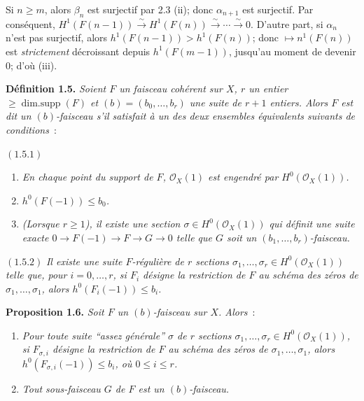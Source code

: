 Si \(n\ge m\),
alors \(\beta_n\) est surjectif par 2.3 (ii); donc \(\alpha_{n+1}\) est surjectif. Par conséquent, \(H^1(F(n-1))\xrightarrow{\sim}H^1(F(n))\xrightarrow{\sim}\cdots\xrightarrow{\sim}0\). D'autre part, si \(\alpha_n\) n'est pas surjectif, alors \(h^1(F(n-1))>h^1(F(n))\); donc \(\mapsto n^1(F(n))\) est \emph{strictement} décroissant depuis \(h^1(F(m-1))\), jusqu'au moment de devenir \(0\); d'où (iii).

\textbf{Définition 1.5.} \emph{Soient \(F\) un faisceau cohérent sur \(X\), \(r\) un entier \(\ge\operatorname{dim{.}supp}(F)\) et \((b)=(b_0,\ldots,b_r)\) une suite de \(r+1\) entiers. Alors \(F\) est dit un \emph{\((b)\)-faisceau} s'il satisfait à un des deux ensembles équivalents suivants de conditions}~:

\((1.5.1)\)
\begin{enumerate}[label=(\roman*)]
\item \emph{En chaque point du support de \(F\), \(\mathcal O_X(1)\) est engendré par \(H^0(\mathcal O_X(1))\).}
\item \emph{\(h^0(F(-1))\le b_0\).}
\item \emph{(Lorsque \(r\ge1\)), il existe une section \(\sigma\in H^0(\mathcal O_X(1))\) qui définit une suite exacte \(0\to F(-1)\to F\to G\to0\) telle que \(G\) soit un \((b_1,\ldots,b_r)\)-faisceau.}
\end{enumerate}

\((1.5.2)\) \emph{Il existe une suite \(F\)-régulière de \(r\) sections \(\sigma_1,\ldots,\sigma_r\in H^0(\mathcal O_X(1))\) telle que, pour \(i=0,\ldots,r\), si \(F_i\) désigne la restriction de \(F\) au schéma des zéros de \(\sigma_1,\ldots,\sigma_1\), alors \(h^0(F_i(-1))\le b_i\).}

\textbf{Proposition 1.6.} \emph{Soit \(F\) un \((b)\)-faisceau sur \(X\). Alors}~:
\begin{enumerate}[label=(\roman*)]
\item \emph{Pour toute suite ``assez générale'' \(\sigma\) de \(r\) sections \(\sigma_1,\ldots,\sigma_r\in H^0(\mathcal O_X(1))\), si \(F_{\sigma,i}\) désigne la restriction de \(F\) au schéma des zéros de \(\sigma_1,\ldots,\sigma_1\), alors \(h^0(F_{\sigma,i}(-1))\le b_i\), où \(0\le i\le r\).}
\item \emph{Tout sous-faisceau \(G\) de \(F\) est un \((b)\)-faisceau.}
\end{enumerate}

